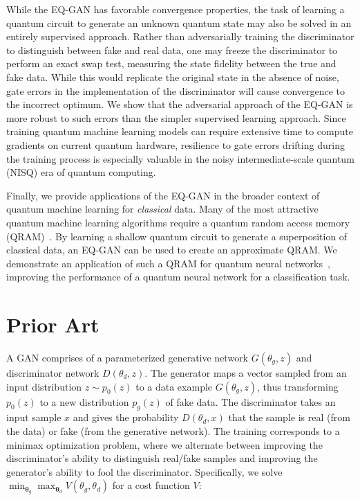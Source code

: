 \documentclass[prl,superscriptaddress,twocolumn]{revtex4}
\theoremstyle{plain}
\theoremstyle{definition}
\begin{document}
While the EQ-GAN has favorable convergence properties, the task of learning a quantum circuit to generate an unknown quantum state may also be solved in an entirely supervised approach. Rather than adversarially training the discriminator to distinguish between fake and real data, one may freeze the discriminator to perform an exact swap test, measuring the state fidelity between the true and fake data. While this would replicate the original state in the absence of noise, gate errors in the implementation of the discriminator will cause convergence to the incorrect optimum. We show that the adversarial approach of the EQ-GAN is more robust to such errors than the simpler supervised learning approach.  Since training quantum machine learning models can require extensive time to compute gradients on current quantum hardware, resilience to gate errors drifting during the training process is especially valuable in the noisy intermediate-scale quantum (NISQ) era of quantum computing.

Finally, we provide applications of the EQ-GAN in the broader context of quantum machine learning for \emph{classical} data. Many of the most attractive quantum machine learning algorithms require a quantum random access memory (QRAM)~\cite{lloyd2016}. By learning a shallow quantum circuit to generate a superposition of classical data, an EQ-GAN can be used to create an approximate QRAM. We demonstrate an application of such a QRAM for quantum neural networks~\cite{farhi2018classification}, improving the performance of a quantum neural network for a classification task.

\section{Prior Art}%
A GAN comprises of a parameterized generative network $G(\theta_g, z)$ and discriminator network $D(\theta_d, z)$. The generator maps a vector sampled from an input distribution $z \sim p_0(z)$ to a data example $G(\theta_g, z)$, thus transforming $p_0(z)$ to a new distribution $p_g(z)$ of fake data. The discriminator takes an input sample $x$ and gives the probability $D(\theta_d, x)$ that the sample is real (from the data) or fake (from the generative network). The training corresponds to a minimax optimization problem, where we alternate between improving the discriminator's ability to distinguish real/fake samples and improving the generator's ability to fool the discriminator. Specifically, we solve $\min_{\mathbf{\theta}_g}\max_{\mathbf{\theta}_d} V(\theta_g, \theta_d)$ for a cost function $V$:
\end{document}
